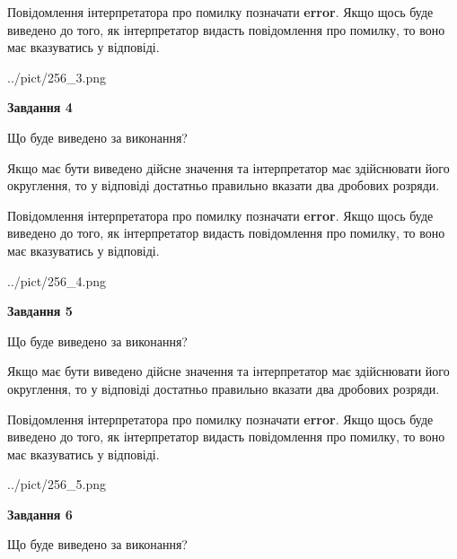 \documentclass[12pt, ukrainian]{article}
\begin{document}
{\begin {Large}
Повідомлення інтерпретатора про помилку позначати \textbf{error}.
Якщо щось буде виведено до того, як інтерпретатор видасть повідомлення про помилку, 
то воно має вказуватись у відповіді. \par

\begin{center}
	{../pict/256_3.png}
\end{center}
\newpage

{\begin {center}\textbf{Завдання 4}\end {center}}\par
Що буде виведено за виконання? \par

Якщо має бути виведено дійсне значення та інтерпретатор має здійснювати його округлення, 
то у відповіді достатньо правильно вказати два дробових розряди.

Повідомлення інтерпретатора про помилку позначати \textbf{error}.
Якщо щось буде виведено до того, як інтерпретатор видасть повідомлення про помилку, 
то воно має вказуватись у відповіді. \par

\begin{center}
	{../pict/256_4.png}
\end{center}
\newpage

{\begin {center}\textbf{Завдання 5}\end {center}}\par
Що буде виведено за виконання? \par

Якщо має бути виведено дійсне значення та інтерпретатор має здійснювати його округлення, 
то у відповіді достатньо правильно вказати два дробових розряди.

Повідомлення інтерпретатора про помилку позначати \textbf{error}.
Якщо щось буде виведено до того, як інтерпретатор видасть повідомлення про помилку, 
то воно має вказуватись у відповіді. \par

\begin{center}
	{../pict/256_5.png}
\end{center}
\newpage

{\begin {center}\textbf{Завдання 6}\end {center}}\par
Що буде виведено за виконання? \par


\end{Large}}
\end{document}
